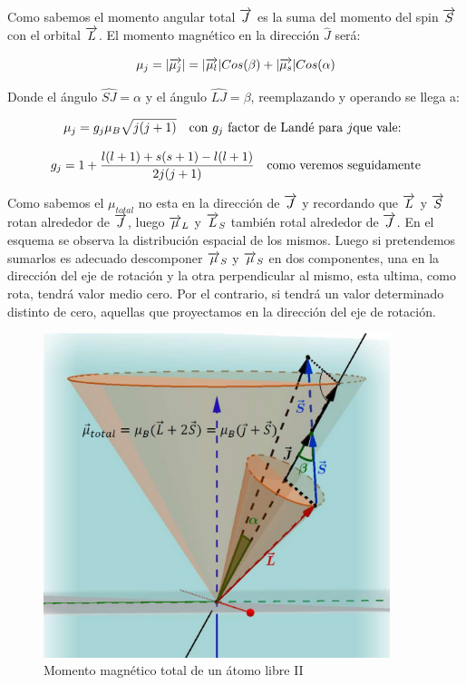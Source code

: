 Como sabemos el momento angular total $\overrightarrow{J}$ es la suma del momento del spin $\overrightarrow{S}$ con el orbital $\overrightarrow{L}$. El momento magnético en la dirección $\hat{J}$ será:

\begin{equation}
	\mu_{j}=\vert \overrightarrow{\mu_{j}} \vert=\vert \overrightarrow{\mu_{l}} \vert Cos(\beta)+\vert \overrightarrow{\mu_{s}} \vert Cos(\alpha)
\end{equation}

Donde el ángulo $\hat{SJ}= \alpha$ y el ángulo $\hat{LJ}=\beta$, reemplazando y operando se llega a:

\begin{equation*}
	\mu_{j}=g_{j}\mu_{B}\sqrt{j(j + 1)} \quad \text{con } g_{j} \text{ factor de Landé para } j \text{que vale: }
\end{equation*}

\begin{equation*}
	g_{j}= 1 +\dfrac{l(l + 1)+s(s + 1)-l(l + 1)}{2j(j + 1)} \quad \text{como veremos seguidamente}
\end{equation*}

Como sabemos el $\mu_{total}$ no esta en la dirección de $\overrightarrow{J}$ y recordando que $\overrightarrow{L}$ y $\overrightarrow{S}$ rotan alrededor de $\overrightarrow{J}$, luego $\overrightarrow{\mu}_{L}$ y $\overrightarrow{L}_{S}$  también rotal alrededor de $\overrightarrow{J}$. En el esquema se observa la distribución espacial de los mismos. Luego si pretendemos sumarlos es adecuado descomponer $\overrightarrow{\mu}_{S}$ y $\overrightarrow{\mu}_{S}$ en dos componentes, una en la dirección del eje de rotación y la otra perpendicular al mismo, esta ultima, como rota, tendrá valor medio cero. Por el contrario, si tendrá un valor determinado distinto de cero, aquellas que proyectamos en la dirección del eje de rotación.


\begin{figure}[H]
    \centering
    \includegraphics[width=0.9\textwidth]{./Figures/fig118}
	\caption{Momento magnético total de un átomo libre II}
	\label{fig:118}
 \end{figure}

